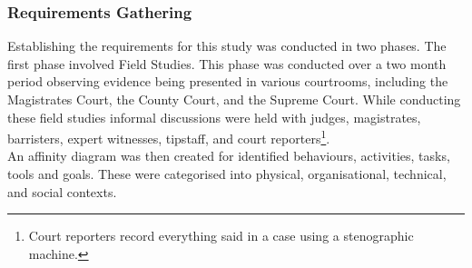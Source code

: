 \subsubsection{Requirements Gathering}
Establishing the requirements for this study was conducted in two phases. The first phase involved Field Studies. This phase was conducted over a two month period observing evidence being presented in various courtrooms, including the Magistrates Court, the County Court, and the Supreme Court. While conducting these field studies informal discussions were held with judges, magistrates, barristers, expert witnesses, tipstaff, and court reporters\footnote{Court reporters record everything said in a case using a stenographic machine.  }.\\
An affinity diagram was then created for identified behaviours, activities, tasks, tools and goals. These were categorised into physical, organisational, technical, and social contexts.
